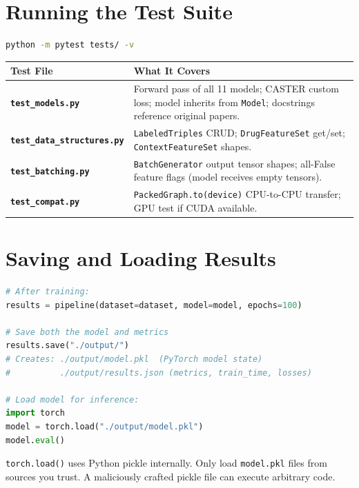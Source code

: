 \documentclass[12pt,a4paper,oneside]{book}
\begin{document}
\section{Running the Test Suite}

\begin{lstlisting}[language=bash]
python -m pytest tests/ -v
\end{lstlisting}

\begin{longtable}{>{\bfseries}p{5cm}p{9cm}}
\toprule
Test File & What It Covers \\
\midrule\endhead
\texttt{test\_models.py} & Forward pass of all 11 models; CASTER custom loss; model inherits from \texttt{Model}; docstrings reference original papers. \\
\texttt{test\_data\_structures.py} & \texttt{LabeledTriples} CRUD; \texttt{DrugFeatureSet} get/set; \texttt{ContextFeatureSet} shapes. \\
\texttt{test\_batching.py} & \texttt{BatchGenerator} output tensor shapes; all-False feature flags (model receives empty tensors). \\
\texttt{test\_compat.py} & \texttt{PackedGraph.to(device)} CPU-to-CPU transfer; GPU test if CUDA available. \\
\bottomrule
\end{longtable}

\section{Saving and Loading Results}

\begin{lstlisting}[language=Python]
# After training:
results = pipeline(dataset=dataset, model=model, epochs=100)

# Save both the model and metrics
results.save("./output/")
# Creates: ./output/model.pkl  (PyTorch model state)
#          ./output/results.json (metrics, train_time, losses)

# Load model for inference:
import torch
model = torch.load("./output/model.pkl")
model.eval()
\end{lstlisting}

\begin{tcolorbox}[warnbox]
\texttt{torch.load()} uses Python pickle internally. Only load \texttt{model.pkl} files from sources you trust. A maliciously crafted pickle file can execute arbitrary code.
\end{tcolorbox}
\end{document}
